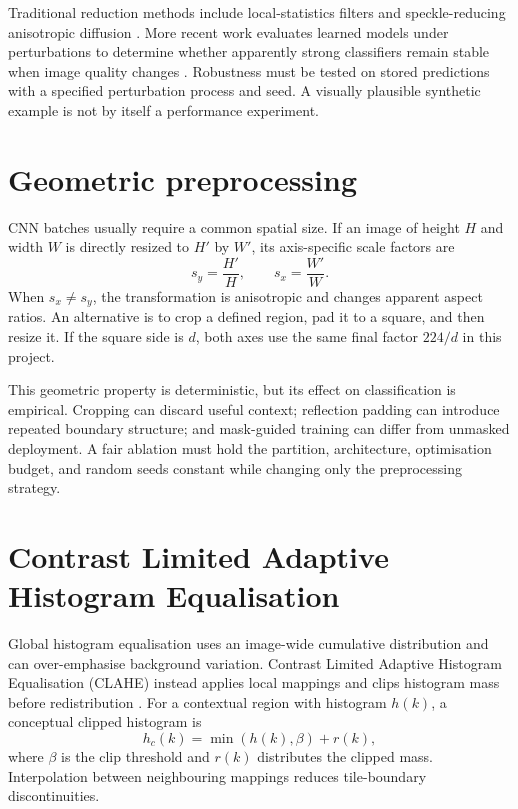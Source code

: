 Traditional reduction methods include local-statistics filters and speckle-reducing anisotropic diffusion \citep{Lee1980,Yu2002}. More recent work evaluates learned models under perturbations to determine whether apparently strong classifiers remain stable when image quality changes \citep{Jiang2023}. Robustness must be tested on stored predictions with a specified perturbation process and seed. A visually plausible synthetic example is not by itself a performance experiment.

\section{Geometric preprocessing}
CNN batches usually require a common spatial size. If an image of height $H$ and width $W$ is directly resized to $H'$ by $W'$, its axis-specific scale factors are
\begin{equation}
s_y=\frac{H'}{H}, \qquad s_x=\frac{W'}{W}.
\end{equation}
When $s_x\neq s_y$, the transformation is anisotropic and changes apparent aspect ratios. An alternative is to crop a defined region, pad it to a square, and then resize it. If the square side is $d$, both axes use the same final factor $224/d$ in this project.

This geometric property is deterministic, but its effect on classification is empirical. Cropping can discard useful context; reflection padding can introduce repeated boundary structure; and mask-guided training can differ from unmasked deployment. A fair ablation must hold the partition, architecture, optimisation budget, and random seeds constant while changing only the preprocessing strategy.

\section{Contrast Limited Adaptive Histogram Equalisation}
Global histogram equalisation uses an image-wide cumulative distribution and can over-emphasise background variation. Contrast Limited Adaptive Histogram Equalisation (CLAHE) instead applies local mappings and clips histogram mass before redistribution \citep{Zuiderveld1994}. For a contextual region with histogram $h(k)$, a conceptual clipped histogram is
\begin{equation}
h_c(k)=\min(h(k),\beta)+r(k),
\end{equation}
where $\beta$ is the clip threshold and $r(k)$ distributes the clipped mass. Interpolation between neighbouring mappings reduces tile-boundary discontinuities.

